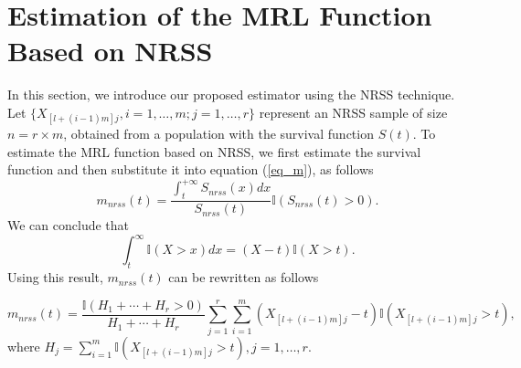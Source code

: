 \documentclass[twoside]{article}
\begin{document}
\section{ Estimation of the MRL Function Based on NRSS } \label{Sec3}
In this section, we introduce our proposed estimator using the NRSS technique. Let  $\{{X_{\left[l+\left(i-1\right)m \right]j}},i = 1,\dots,m;j = 1,\dots,r\} $ represent an NRSS sample of size $n=r\times m$, obtained from a population with the survival function $S(t)$.
To estimate the MRL function based on NRSS, we first estimate the survival function and then substitute it into equation (\ref{eq_m}), as follows
\begin{equation}
	{m_{nrss}}\left(t\right)=\frac{{\int_{t}^{+\infty}{{S_{nrss}}\left(x\right)dx}}}{{{S_{nrss}}\left(t\right)}}\mathbb{I}\left({{S_{nrss}}\left(t\right)>0}\right).
\end{equation}
We can  conclude that 
$$ \int_t^\infty  \mathbb{I}\left( {X > x} \right)dx=\left(X-t\right)\mathbb{I}\left(X>t\right).$$
Using  this result, ${m_{nrss}}\left( t \right)$ can be rewritten as follows

\begin{equation}
	{m_{nrss}}\left( t \right) = \frac{{\mathbb{I}\left( {{H_1} +  \cdots  + {H_r} > 0} \right)}}{{{H_1} +  \cdots  + {H_r}}}\sum\limits_{j = 1}^r {\sum\limits_{i = 1}^m {\left( {{X_{\left[ {l + \left( {i - 1} \right)m} \right]j}} - t} \right)} } \mathbb{I}\left( {{X_{\left[ {l + \left( {i - 1} \right)m} \right]j}} > t} \right),
\end{equation}
where ${H_j} = \sum\nolimits_{i = 1}^m {\mathbb{I}\left( {{X_{\left[ {l + \left( {i - 1} \right)m} \right]j}} > t} \right)} ,j = 1, \ldots ,r$.
\end{document}
